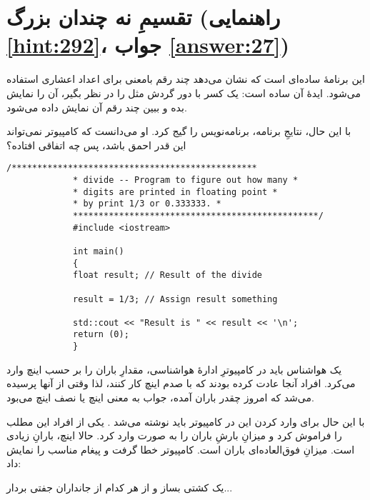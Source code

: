 \section[تقسیمِ نه چندان بزرگ]{تقسیمِ نه چندان بزرگ \protect{} (راهنمایی \ref{hint:292}، جواب \ref{answer:27})}
این برنامهٔ ساده‌ای است که نشان می‌دهد چند رقم بامعنی برای اعداد اعشاری استفاده می‌شود. ایدهٔ آن ساده است: یک کسر با دور گردش مثل  را در نظر بگیر، آن را نمایش بده و ببین چند رقم آن نمایش داده می‌شود.

با این حال، نتایجِ برنامه، برنامه‌نویس را گیج کرد. او می‌دانست که کامپیوتر نمی‌تواند این قدر احمق باشد، پس چه اتفاقی افتاده؟

\begin{LTR}
        \begin{lstlisting}[style=C++Style]
             /************************************************
             * divide -- Program to figure out how many *
             * digits are printed in floating point *
             * by print 1/3 or 0.333333. *
             ************************************************/
             #include <iostream>

             int main()
             {
             float result; // Result of the divide

             result = 1/3; // Assign result something

             std::cout << "Result is " << result << '\n';
             return (0);
             }
        \end{lstlisting}
\end{LTR}

\begin{tcolorbox}
    یک هواشناس باید در کامپیوترِ ادارهٔ هواشناسی، مقدارِ باران را بر حسب اینچ وارد می‌کرد. افراد آنجا عادت کرده بودند که با صدم اینچ کار کنند، لذا وقتی از آنها پرسیده می‌شد که امروز چقدر باران آمده، جواب  به معنی  اینچ یا نصف اینچ می‌بود.

    با این حال برای وارد کردن این در کامپیوتر باید نوشته می‌شد . یکی از افراد این مطلب را فراموش کرد و میزانِ بارشِ باران را به صورت  وارد کرد. حالا  اینچ، بارانِ زیادی است. میزانِ فوق‌العاده‌ای باران است. کامپیوتر خطا گرفت و پیغام مناسب را نمایش داد:

    یک کشتی بساز و از هر کدام از جانداران جفتی بردار...
\end{tcolorbox}
